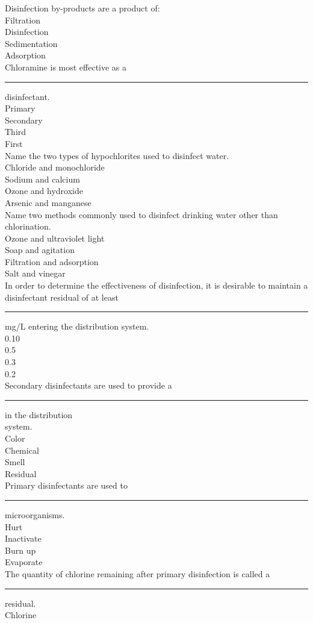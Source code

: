 Disinfection by-products are a product of:\\
Filtration\\
Disinfection\\
Sedimentation\\
Adsorption\\
Chloramine is most effective as a \rule{2cm}{0.3pt} disinfectant.\\
Primary\\
Secondary\\
Third\\
First\\
Name the two types of hypochlorites used to disinfect water.\\
Chloride and monochloride\\
Sodium and calcium\\
Ozone and hydroxide\\
Arsenic and manganese\\
Name two methods commonly used to disinfect drinking water other than chlorination.\\
Ozone and ultraviolet light\\
Soap and agitation\\
Filtration and adsorption\\
Salt and vinegar\\
In order to determine the effectiveness of disinfection, it is desirable to maintain a disinfectant residual of at least \rule{2cm}{0.3pt} mg/L entering the distribution system.\\
0.10\\
0.5\\
0.3\\
0.2\\
Secondary disinfectants are used to provide a \rule{2cm}{0.3pt} in the distribution\\
system.\\
Color\\
Chemical\\
Smell\\
Residual\\
Primary disinfectants are used to \rule{2cm}{0.3pt}microorganisms.\\
Hurt\\
Inactivate\\
Burn up\\
Evaporate\\
The quantity of chlorine remaining after primary disinfection is called a \rule{2cm}{0.3pt} residual.\\
Chlorine\\
